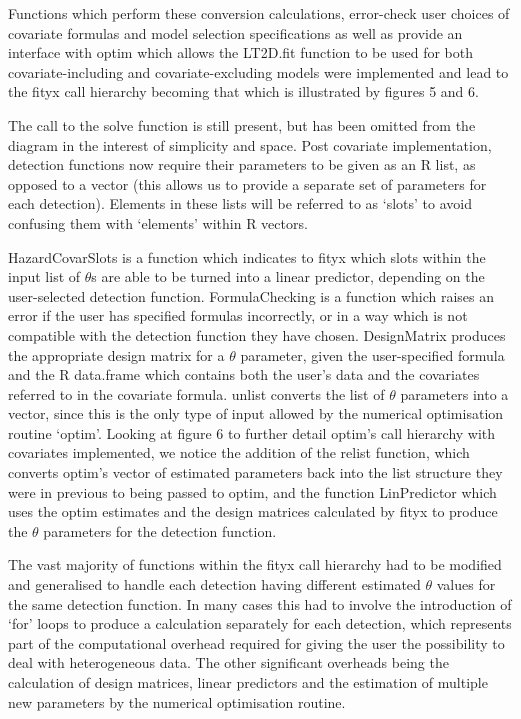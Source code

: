 \documentclass[11pt]{article}
\begin{document}
\begin{multicols}{2}
Functions which perform these conversion calculations, error-check user choices of covariate formulas and model selection specifications as well as provide an interface with optim which allows the LT2D.fit function to be used for both covariate-including and covariate-excluding models were implemented and lead to the fityx call hierarchy becoming that which is illustrated by figures 5 and 6. 

The call to the solve function is still present, but has been omitted from the diagram in the interest of simplicity and space. Post covariate implementation, detection functions now require their parameters to be given as an R list, as opposed to a vector (this allows us to provide a separate set of parameters for each detection). Elements in these lists will be referred to as `slots' to avoid confusing them with `elements' within R vectors. 

HazardCovarSlots is a function which indicates to fityx which slots within the input list of $\theta$s are able to be turned into a linear predictor, depending on the user-selected detection function. FormulaChecking is a function which raises an error if the user has specified formulas incorrectly, or in a way which is not compatible with the detection function they have chosen. DesignMatrix produces the appropriate design matrix for a $\theta$  parameter, given the user-specified formula and the R data.frame which contains both the user's data and the covariates referred to in the covariate formula. unlist converts the list of $\theta$ parameters into a vector, since this is the only type of input allowed by the numerical optimisation routine `optim'. Looking at figure 6 to further detail optim's call hierarchy with covariates implemented, we notice the addition of the relist function, which converts optim's vector of estimated parameters back into the list structure they were in previous to being passed to optim, and the function LinPredictor which uses the optim estimates and the design matrices calculated by fityx to produce the $\theta$ parameters for the detection function.

The vast majority of functions within the fityx call hierarchy had to be modified and generalised to handle each detection having different estimated $\theta$ values for the same detection function. In many cases this had to involve the introduction of `for' loops to produce a calculation separately for each detection, which represents part of the computational overhead required for giving the user the possibility to deal with  heterogeneous data. The other significant overheads being the calculation of design matrices, linear predictors and the estimation of multiple new parameters by the numerical optimisation routine.  


\end{multicols}
\end{document}
